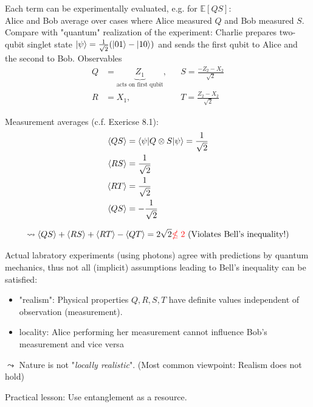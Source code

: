 Each term can be experimentally evaluated, e.g. for $\mathbb{E}[QS]$: \\
Alice and Bob average over cases where Alice measured $Q$ and Bob measured $S$. \\

Compare with "quantum" realization of the experiment: 
Charlie prepares two-qubit singlet state $\lvert\psi\rangle = \frac{1}{\sqrt{2}} (\lvert01\rangle - \lvert10\rangle)$
and sends the first qubit to Alice and the second to Bob.
Observables
\begin{align*}
    Q &= \underbrace{Z_1}_{\text{acts on first qubit}}, 
        &&S = \frac{-Z_2 - X_2}{\sqrt{2}} \\
    R &= X_1, &&T = \frac{Z_2 - X_2}{\sqrt{2}}
\end{align*}

Measurement averages (c.f. Exericse 8.1):
\begin{align*}
    \left\langle  QS \right\rangle &= \left \langle \psi \middle| Q \otimes S \middle| \psi \right \rangle = \frac{1}{\sqrt{2}} \\
    \left\langle  RS \right\rangle &= \frac{1}{\sqrt{2}} \\
    \left\langle  RT \right\rangle &= \frac{1}{\sqrt{2}} \\
    \left\langle  QS \right\rangle &= -\frac{1}{\sqrt{2}} 
\end{align*}

\begin{equation*}
    \leadsto  
        \left\langle  QS \right\rangle + 
        \left\langle  RS \right\rangle + 
        \left\langle  RT \right\rangle - 
        \left\langle  QT \right\rangle = 2 \sqrt{2} {\color{red} \nleq 2} \text{ (Violates Bell's inequality!)}
\end{equation*}

Actual labratory experiments (using photons) agree with predictions by quantum mechanics, 
thus not all (implicit) assumptions leading to Bell's inequality can be satisfied: \\

\begin{itemize}
    \item "realism": Physical properties $Q, R, S, T$ have definite values independent of observation
    (measurement).
    \item locality: Alice performing her measurement cannot influence Bob's measurement and vice versa
\end{itemize}

$\leadsto$  Nature is not "\textit{locally realistic}". 
(Most common viewpoint: Realism does not hold)

Practical lesson: Use entanglement as a resource.